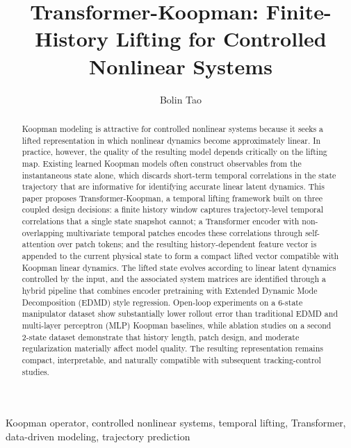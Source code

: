 \documentclass[journal]{IEEEtran}
\begin{document}
\title{Transformer-Koopman: Finite-History Lifting for Controlled Nonlinear Systems}

\author{Bolin Tao}


\maketitle

\begin{abstract}
Koopman modeling is attractive for controlled nonlinear systems because it seeks a lifted representation in which nonlinear dynamics become approximately linear. In practice, however, the quality of the resulting model depends critically on the lifting map. Existing learned Koopman models often construct observables from the instantaneous state alone, which discards short-term temporal correlations in the state trajectory that are informative for identifying accurate linear latent dynamics. This paper proposes Transformer-Koopman, a temporal lifting framework built on three coupled design decisions: a finite history window captures trajectory-level temporal correlations that a single state snapshot cannot; a Transformer encoder with non-overlapping multivariate temporal patches encodes these correlations through self-attention over patch tokens; and the resulting history-dependent feature vector is appended to the current physical state to form a compact lifted vector compatible with Koopman linear dynamics. The lifted state evolves according to linear latent dynamics controlled by the input, and the associated system matrices are identified through a hybrid pipeline that combines encoder pretraining with Extended Dynamic Mode Decomposition (EDMD) style regression. Open-loop experiments on a 6-state manipulator dataset show substantially lower rollout error than traditional EDMD and multi-layer perceptron (MLP) Koopman baselines, while ablation studies on a second 2-state dataset demonstrate that history length, patch design, and moderate regularization materially affect model quality. The resulting representation remains compact, interpretable, and naturally compatible with subsequent tracking-control studies.
\end{abstract}

\begin{IEEEkeywords}
Koopman operator, controlled nonlinear systems, temporal lifting, Transformer, data-driven modeling, trajectory prediction
\end{IEEEkeywords}
\end{document}
